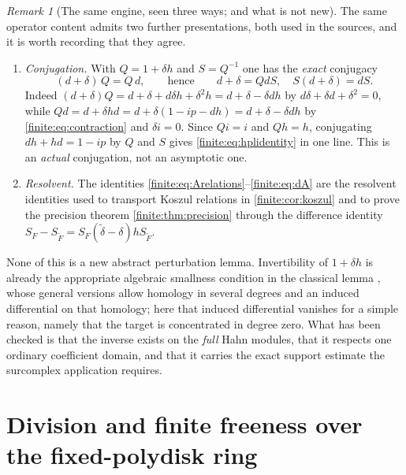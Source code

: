 \documentclass[11pt,letterpaper]{article}
\theoremstyle{definition}
\theoremstyle{remark}
\newtheorem{remark}[theorem]{Remark}
\numberwithin{equation}{section}
\begin{document}
\begin{remark}[The same engine, seen three ways; and what is not new]
\label{finite:rem:conjugation}
The same operator content admits two further presentations, both used in the sources, and it is worth recording that they agree.
\begin{enumerate}
\item \emph{Conjugation.} With $Q=1+\delta h$ and $S=Q^{-1}$ one has the \emph{exact} conjugacy
\begin{equation}\label{finite:eq:conjugation}
 (d+\delta)\,Q=Q\,d,
 \qquad\text{hence}\qquad
 d+\delta=QdS,\quad S(d+\delta)=dS .
\end{equation}
Indeed $(d+\delta)Q=d+\delta+d\delta h+\delta^2h=d+\delta-\delta dh$ by $d\delta+\delta d+\delta^2=0$, while $Qd=d+\delta hd=d+\delta(1-ip-dh)=d+\delta-\delta dh$ by \eqref{finite:eq:contraction} and $\delta i=0$. Since $Qi=i$ and $Qh=h$, conjugating $dh+hd=1-ip$ by $Q$ and $S$ gives \eqref{finite:eq:hplidentity} in one line. This is an \emph{actual} conjugation, not an asymptotic one.
\item \emph{Resolvent.} The identities \eqref{finite:eq:Arelations}--\eqref{finite:eq:dA} are the resolvent identities used to transport Koszul relations in \cref{finite:cor:koszul} and to prove the precision theorem \cref{finite:thm:precision} through the difference identity $S_F-S_{\widetilde F}=S_F(\widetilde\delta-\delta)hS_{\widetilde F}$.
\end{enumerate}
None of this is a new abstract perturbation lemma. Invertibility of $1+\delta h$ is already the appropriate algebraic smallness condition in the classical lemma \cite{finite:Crainic}, whose general versions allow homology in several degrees and an induced differential on that homology; here that induced differential vanishes for a simple reason, namely that the target is concentrated in degree zero. What has been checked is that the inverse exists on the \emph{full} Hahn modules, that it respects one ordinary coefficient domain, and that it carries the exact support estimate the surcomplex application requires.
\end{remark}

\section{Division and finite freeness over the fixed-polydisk ring}
\label{finite:sec:division}
\end{document}
